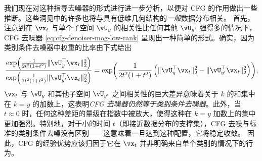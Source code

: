 \documentclass[../../book-main_zh.tex]{subfiles}
\begin{document}
\begin{example}
  我们现在对这种指导去噪器的形式进行进一步分析，以便对 CFG 的作用做出一些推断。这些洞见中的许多也将与具有低维几何结构的\textit{一般}数据分布相关。
  首先，注意到在 $\vx_t$ 与单个子空间 $\vU_y$ 的相关性比任何其他 $\vU_{y'}$ 强得多的情况下，CFG 去噪器 \eqref{eq:cfg-denoiser-mog-low-rank} 呈现出一种简单的形式。确实，因为类别条件去噪器中权重的比率由下式给出
  \begin{equation}
    \frac{
      \exp\rp{\frac{1}{2t^{2}(1 + t^{2})}\norm{\vU_{y}^{\top}\vx_t}_{2}^{2}}
    }{
      \exp\rp{\frac{1}{2t^{2}(1 + t^{2})}\norm{\vU_{y'}^{\top}\vx_t}_{2}^{2}}
    }
    =
    \exp\rp{
      \frac{1}{2t^{2}(1 + t^{2})}\left(
      \norm{\vU_{y}^{\top}\vx_t}_{2}^{2}
      -
      \norm{\vU_{y'}^{\top}\vx_t}_{2}^{2}
      \right)
    },
  \end{equation}
  $\vx_t$ 与 $\vU_{y}$ 和其他子空间 $\vU_{y'}$ 之间相关性的巨大差异意味着关于 $k$ 的和集中在 $k=y$ 的加数上，这表明\textit{CFG 去噪器仍然等于类别条件去噪器}。此外，当 $t \approx 0$ 时，任何这种差距的量级在指数中被放大，使得这种在 $k=y$ 加数上的集中更加强烈。特别地，对于小的时间 $t$（即接近数据分布的支撑集），CFG 去噪与标准的类别条件去噪没有区别——这意味着一旦达到这种配置，它将稳定收敛。
  因此，CFG 的经验优势应该归因于它在 $\vx_t$ 并非明确来自单个类别的情况下的行为。


\end{example}
\end{document}
